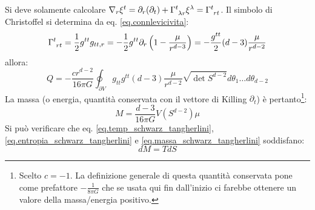 Si deve solamente calcolare $\nabla_r \xi^t = \partial_r(\partial_t) + \tensor{\Gamma}{^t_{\lambda r}}\xi^\lambda = \tensor{\Gamma}{^t_{rt}}$. Il simbolo di Christoffel si determina da eq. \ref{eq.connlevicivita}:
\begin{equation*}
    \tensor{\Gamma}{^t_{rt}} = \frac{1}{2}g^{tt}g_{tt,r} = - \frac{1}{2}g^{tt}\partial_r\left( 1 - \frac{\mu}{r^{d-3}}\right) = - \frac{g^{tt}}{2}(d-3)\frac{\mu}{r^{d-2}}
\end{equation*}
allora:
\begin{equation*}
    Q = -\frac{c r^{d-2}}{16\pi G}\oint_{\partial V} g_{tt}g^{tt}(d-3)\frac{\mu}{r^{d-2}}\sqrt{\det S^{d-2}}d\theta_1 \dots d\theta_{d-2}
\end{equation*}
La massa (o energia, quantità conservata con il vettore di Killing $\partial_t$) è pertanto\footnote{Scelto $c=-1$. La definizione generale di questa quantità conservata pone come prefattore $-\frac{1}{8\pi G}$ che se usata qui fin dall'inizio ci farebbe ottenere un valore della massa/energia positivo.}:
\begin{equation}
    M = \frac{d-3}{16 \pi G} V(S^{d-2})\mu
    \label{eq.massa_schwarz_tangherlini}
\end{equation}
Si può verificare che eq. \ref{eq.temp_schwarz_tangherlini},
 \ref{eq.entropia_schwarz_tangherlini} e \ref{eq.massa_schwarz_tangherlini} soddisfano:
 \begin{equation*}
     dM = TdS
 \end{equation*}

